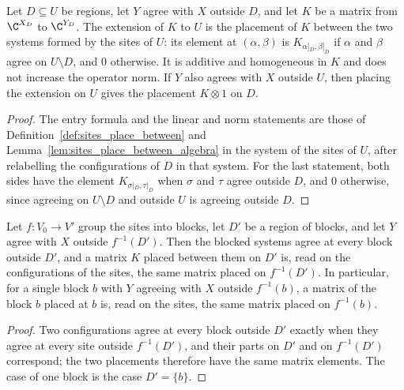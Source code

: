 \begin{lemma}
    \label{lem:sites_subregion_place_between}
    \leanok
    Let $D\subseteq U$ be regions, let $Y$ agree with $X$ outside $D$, and let $K$
    be a matrix from $\C^{X_D}$ to $\C^{Y_D}$. The extension of $K$ to $U$ is the
    placement of $K$ between the two systems formed by the sites of $U$: its
    element at $(\alpha,\beta)$ is $K_{\alpha|_D,\beta|_D}$ if $\alpha$ and $\beta$
    agree on $U\setminus D$, and $0$ otherwise. It is additive and homogeneous in $K$
    and does not increase the operator norm. If $Y$ also agrees with $X$ outside $U$,
    then placing the extension on $U$ gives the placement $K\otimes1$ on $D$.
\end{lemma}
\begin{proof}\leanok
    The entry formula and the linear and norm statements are those of
    Definition~\ref{def:sites_place_between} and
    Lemma~\ref{lem:sites_place_between_algebra} in the system of the sites of $U$,
    after relabelling the configurations of $D$ in that system. For the last
    statement, both sides have the element $K_{\sigma|_D,\tau|_D}$ when $\sigma$ and
    $\tau$ agree outside $D$, and $0$ otherwise, since agreeing on $U\setminus D$ and
    outside $U$ is agreeing outside $D$.
\end{proof}

\begin{lemma}
    \label{lem:sites_place_between_blocks}
    \leanok
    Let $f\colon V_0\to V'$ group the sites into blocks, let $D'$ be a region of
    blocks, and let $Y$ agree with $X$ outside $f^{-1}(D')$. Then the blocked
    systems agree at every block outside $D'$, and a matrix $K$ placed between them
    on $D'$ is, read on the configurations of the sites, the same matrix placed on
    $f^{-1}(D')$. In particular, for a single block $b$ with $Y$ agreeing with $X$
    outside $f^{-1}(b)$, a matrix of the block $b$ placed at $b$ is, read on the
    sites, the same matrix placed on $f^{-1}(b)$.
\end{lemma}
\begin{proof}\leanok
    Two configurations agree at every block outside $D'$ exactly when they agree at
    every site outside $f^{-1}(D')$, and their parts on $D'$ and on $f^{-1}(D')$
    correspond; the two placements therefore have the same matrix elements. The
    case of one block is the case $D'=\{b\}$.
\end{proof}

